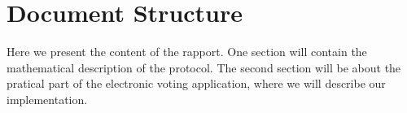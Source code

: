\section{Document Structure}
Here we present the content of the rapport. One section will contain the mathematical description of the protocol. The second section will be about the pratical part of the electronic voting application, where we will describe our implementation.
